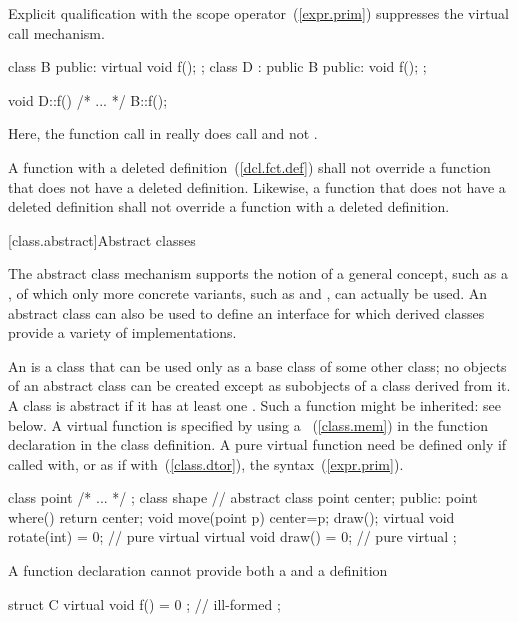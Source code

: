 \pnum
{}%
%
Explicit qualification with the scope operator~(\ref{expr.prim})
suppresses the virtual call mechanism.
\enterexample
\begin{codeblock}
class B { public: virtual void f(); };
class D : public B { public: void f(); };

void D::f() { /* ... */ B::f(); }
\end{codeblock}

Here, the function call in
really does call
and not
.
\exitexample

\pnum
A function with a deleted definition~(\ref{dcl.fct.def}) shall
not override a function that does not have a deleted definition. Likewise,
a function that does not have a deleted definition shall not override a
function with a deleted definition.%

[class.abstract]{Abstract classes}%

\pnum
The abstract class mechanism supports the notion of a general concept,
such as a , of which only more concrete variants, such as
 and , can actually be used. An abstract
class can also be used to define an interface for which derived classes
provide a variety of implementations.

\pnum
An  is a class that can be used only
as a base class of some other class; no objects of an abstract class can
be created except as subobjects of a class derived from it. A class is
abstract if it has at least one .
\enternote
Such a function might be inherited: see below.
\exitnote
{}%
A virtual function is specified  by using a
~(\ref{class.mem}) in the function declaration
in the class definition.
%
A pure virtual function need be defined only if called with, or as if
with~(\ref{class.dtor}), the 
syntax~(\ref{expr.prim}).
\enterexample
{}%
\begin{codeblock}
class point { /* ... */ };
class shape {                   // abstract class
  point center;
public:
  point where() { return center; }
  void move(point p) { center=p; draw(); }
  virtual void rotate(int) = 0; // pure virtual
  virtual void draw() = 0;      // pure virtual
};
\end{codeblock}
\exitexample
\enternote
A function declaration cannot provide both a 
and a definition
\exitnote
\enterexample
\begin{codeblock}
struct C {
  virtual void f() = 0 { };     // ill-formed
};
\end{codeblock}
\exitexample

